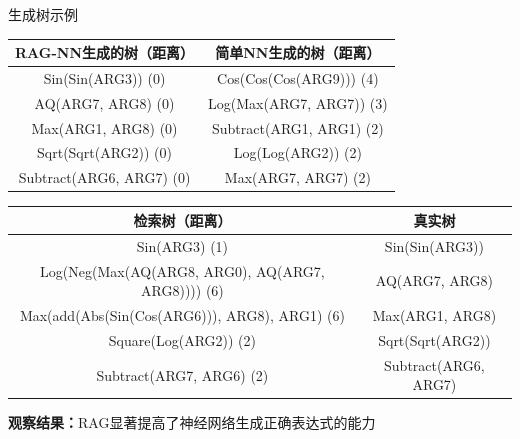 \documentclass[aspectratio=1610]{beamer}
\begin{document}
    \begin{frame}{生成树示例}
        \begin{table}
            \centering
            \footnotesize
            \begin{tabular}{cc}
                \toprule
                RAG-NN生成的树（距离）           & 简单NN生成的树（距离）             \\
                \midrule
                Sin(Sin(ARG3)) (0)       & Cos(Cos(Cos(ARG9))) (4)  \\
                AQ(ARG7, ARG8) (0)       & Log(Max(ARG7, ARG7)) (3) \\
                Max(ARG1, ARG8) (0)      & Subtract(ARG1, ARG1) (2) \\
                Sqrt(Sqrt(ARG2)) (0)     & Log(Log(ARG2)) (2)       \\
                Subtract(ARG6, ARG7) (0) & Max(ARG7, ARG7) (2)      \\
                \bottomrule
            \end{tabular}
        \end{table}

        \begin{table}
            \centering
            \footnotesize
            \begin{tabular}{cc}
                \toprule
                检索树（距离）                                           & 真实树                  \\
                \midrule
                Sin(ARG3) (1)                                     & Sin(Sin(ARG3))       \\
                Log(Neg(Max(AQ(ARG8, ARG0), AQ(ARG7, ARG8)))) (6) & AQ(ARG7, ARG8)       \\
                Max(add(Abs(Sin(Cos(ARG6))), ARG8), ARG1) (6)     & Max(ARG1, ARG8)      \\
                Square(Log(ARG2)) (2)                             & Sqrt(Sqrt(ARG2))     \\
                Subtract(ARG7, ARG6) (2)                          & Subtract(ARG6, ARG7) \\
                \bottomrule
            \end{tabular}
        \end{table}

        \textbf{观察结果：}RAG显著提高了神经网络生成正确表达式的能力
    \end{frame}
\end{document}
